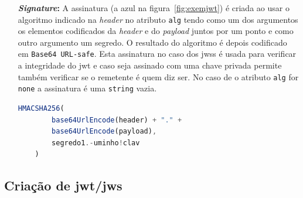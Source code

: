 \begin{itemize}
    Estes atributos registados têm todos 3 caracteres visto que um dos requisitos do \acrshort{jwt} é ser o mais pequeno/compacto possível.

    Existem depois mais dois tipos de atributos, públicos e privados. Os atributos públicos podem ser definidos à vontade pelos utilizadores de \acrshort{jwt}s mas têm de ser registados em \textit{IANA JSON Web Token Claims registry} ou definidos por um espaço de nomes resistente a colisões de forma a evitar a colisão de atributos. Já os atributos privados são aqueles que não são nem registados nem públicos e podem ser definidos à vontade pelos utilizadores de \acrshort{jwt}s. Os dois atributos usados no exemplo~\ref{exem:pay} (\texttt{name} e \texttt{num}) são atributos privados.

    \begin{lstlisting}[language=json, caption=\textit{Payload} usado para construir o \acrshort{jwt} da figura~\ref{fig:exemjwt}, label=exem:pay]
    {
        "name": "José Martins",
        "num": "a78821"
    }
    \end{lstlisting}

\item [\textbf{\textit{Signature}:}] A assinatura (a azul na figura~\ref{fig:exemjwt}) é criada ao usar o algoritmo indicado na \textit{header} no atributo \texttt{alg} tendo como um dos argumentos os elementos codificados da \textit{header} e do \textit{payload} juntos por um ponto e como outro argumento um segredo. O resultado do algoritmo é depois codificado em \texttt{Base64 URL-safe}. Esta assinatura no caso dos \acrshort{jws}s é usada para verificar a integridade do \acrshort{jwt} e caso seja assinado com uma chave privada permite também verificar se o remetente é quem diz ser. No caso de o atributo \texttt{alg} for \texttt{none} a assinatura é uma \texttt{string} vazia.

    \begin{lstlisting}[language=javascript, caption=\textit{Signature} usado para construir o \acrshort{jwt} da figura~\ref{fig:exemjwt}]
    HMACSHA256(
        base64UrlEncode(header) + "." +
        base64UrlEncode(payload),
        segredo1.-uminho!clav
    )
    \end{lstlisting}
\end{itemize}

\subsection{Criação de \acrshort{jwt}/\acrshort{jws}}\label{sec:criacaojwt}


